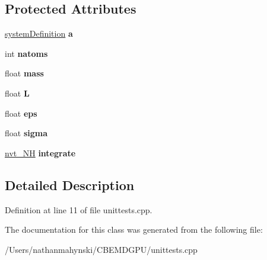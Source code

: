 \subsection*{Protected Attributes}
\begin{DoxyCompactItemize}
\item 
\hypertarget{class_system_test_a5655f7f306ac99a2defe7504b593886c}{\hyperlink{classsystem_definition}{system\-Definition} {\bfseries a}}\label{class_system_test_a5655f7f306ac99a2defe7504b593886c}

\item 
\hypertarget{class_system_test_a55d8b8e8bd1ad2755e9a560d1262d57e}{int {\bfseries natoms}}\label{class_system_test_a55d8b8e8bd1ad2755e9a560d1262d57e}

\item 
\hypertarget{class_system_test_a01059fcb317cac6e522903a0f5f24741}{float {\bfseries mass}}\label{class_system_test_a01059fcb317cac6e522903a0f5f24741}

\item 
\hypertarget{class_system_test_a51339a0790891b5b4e2b8689f8bb6b4e}{float {\bfseries L}}\label{class_system_test_a51339a0790891b5b4e2b8689f8bb6b4e}

\item 
\hypertarget{class_system_test_a5ec2ee91805410518f5662b6b41e395b}{float {\bfseries eps}}\label{class_system_test_a5ec2ee91805410518f5662b6b41e395b}

\item 
\hypertarget{class_system_test_a2022b261d402b0617620e0b1745a25bc}{float {\bfseries sigma}}\label{class_system_test_a2022b261d402b0617620e0b1745a25bc}

\item 
\hypertarget{class_system_test_a970b77c65ebefa8d207538700ebdd4a0}{\hyperlink{classnvt___n_h}{nvt\-\_\-\-N\-H} {\bfseries integrate}}\label{class_system_test_a970b77c65ebefa8d207538700ebdd4a0}

\end{DoxyCompactItemize}


\subsection{Detailed Description}


Definition at line 11 of file unittests.\-cpp.



The documentation for this class was generated from the following file\-:\begin{DoxyCompactItemize}
\item 
/\-Users/nathanmahynski/\-C\-B\-E\-M\-D\-G\-P\-U/unittests.\-cpp\end{DoxyCompactItemize}
